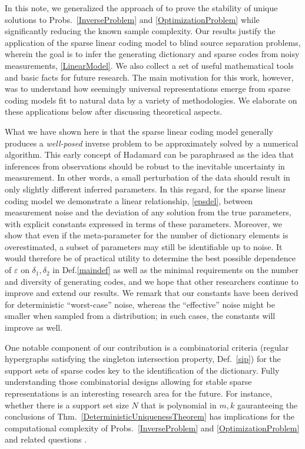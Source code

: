 \documentclass[9pt,twocolumn]{pnas-new}
\begin{document}
In this note, we generalized the approach of \cite{Hillar15} to prove the stability of unique solutions to Probs.~\ref{InverseProblem} and \ref{OptimizationProblem} while significantly reducing the known sample complexity. 
Our results justify the application of the sparse linear coding model to blind source separation problems, wherein the goal is to infer the generating dictionary and sparse codes from noisy measurements, \eqref{LinearModel}. We also collect a set of useful mathematical tools and basic facts for future research.
The main motivation for this work, however, was to understand how seemingly universal representations emerge from sparse coding models fit to natural data by a variety of methodologies. We elaborate on these applications below after discussing theoretical aspects. 

What we have shown here is that the sparse linear coding model generally produces a \textit{well-posed} inverse problem to be approximately solved by a numerical algorithm. This early concept of Hadamard \cite{Hadamard1902} can be paraphrased as the idea that inferences from observations should be robust to the inevitable uncertainty in measurement. In other words, a small perturbation of the data should result in only slightly different inferred parameters. In this regard, for the sparse linear coding model we demonstrate a linear relationship, \eqref{epsdel}, between measurement noise and the deviation of any solution from the true parameters, with explicit constants expressed in terms of these parameters. Moreover, we show that even if the meta-parameter for the number of dictionary elements is overestimated, a subset of parameters may still be identifiable up to noise.
It would therefore be of practical utility to determine the best possible dependence of $\varepsilon$ on $\delta_1, \delta_2$ in Def.\ref{maindef} as well as the minimal requirements on the number and diversity of generating codes, and we hope that other researchers continue to improve and extend our results. We remark that our constants have been derived for deterministic ``worst-case'' noise, whereas the ``effective'' noise might be smaller when sampled from a distribution; in such cases, the constants 
will improve as well.

One notable component of our contribution is a combinatorial criteria (regular hypergraphs satisfying the singleton intersection property, Def.~\ref{sip}) for the support sets of sparse codes key to the identification of the dictionary. Fully understanding those combinatorial designs allowing for stable sparse representations is an interesting research area for the future. For instance, whether there is a support set size $N$ that is polynomial in $m,k$ gauranteeing the conclusions of Thm.~\ref{DeterministicUniquenessTheorem} has implications for the computational complexity of Probs.~\ref{InverseProblem} and \ref{OptimizationProblem} and related questions \cite{Tillmann15}. 
\end{document}
